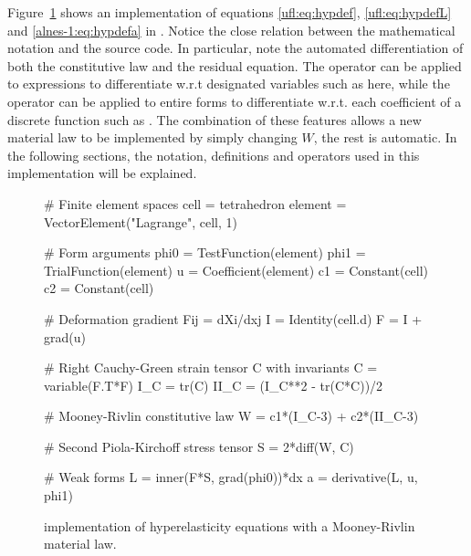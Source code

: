Figure~\ref{ufl:fig:hypcode} shows an implementation of equations
\eqref{ufl:eq:hypdef}, \eqref{ufl:eq:hypdefL} and \eqref{alnes-1:eq:hypdefa}
in \ufl{}.  Notice the close relation between the mathematical notation
and the \ufl{} source code. In particular, note the automated
differentiation of both the constitutive law and the residual
equation. The operator  can be applied to expressions
to differentiate w.r.t designated variables such as  here,
while the operator  can be applied to entire forms
to differentiate w.r.t. each coefficient of a discrete function such
as .  The combination of these features allows a new material
law to be implemented by simply changing $W$, the rest is automatic.
In the following sections, the notation, definitions and operators used
in this implementation will be explained.

\begin{figure}
\begin{uflcode}
# Finite element spaces
cell = tetrahedron
element = VectorElement("Lagrange", cell, 1)

# Form arguments
phi0 = TestFunction(element)
phi1 = TrialFunction(element)
u = Coefficient(element)
c1 = Constant(cell)
c2 = Constant(cell)

# Deformation gradient Fij = dXi/dxj
I = Identity(cell.d)
F = I + grad(u)

# Right Cauchy-Green strain tensor C with invariants
C = variable(F.T*F)
I_C = tr(C)
II_C = (I_C**2 - tr(C*C))/2

# Mooney-Rivlin constitutive law
W = c1*(I_C-3) + c2*(II_C-3)

# Second Piola-Kirchoff stress tensor
S = 2*diff(W, C)

# Weak forms
L = inner(F*S, grad(phi0))*dx
a = derivative(L, u, phi1)
\end{uflcode}
\caption{\ufl{} implementation of hyperelasticity equations with a
Mooney-Rivlin material law.}
\label{ufl:fig:hypcode}
\end{figure}

